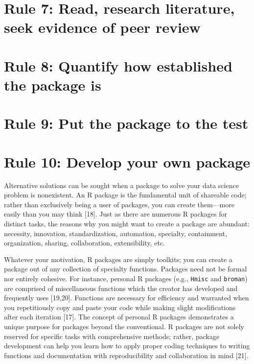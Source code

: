 \documentclass[10pt,letterpaper]{article}
\begin{document}
\hypertarget{rule-7-read-research-literature-seek-evidence-of-peer-review}{%
\section{Rule 7: Read, research literature, seek evidence of peer
review}\label{rule-7-read-research-literature-seek-evidence-of-peer-review}}

\hypertarget{rule-8-quantify-how-established-the-package-is}{%
\section{Rule 8: Quantify how established the package
is}\label{rule-8-quantify-how-established-the-package-is}}

\hypertarget{rule-9-put-the-package-to-the-test}{%
\section{Rule 9: Put the package to the
test}\label{rule-9-put-the-package-to-the-test}}

\hypertarget{rule-10-develop-your-own-package}{%
\section{Rule 10: Develop your own
package}\label{rule-10-develop-your-own-package}}

Alternative solutions can be sought when a package to solve your data
science problem is nonexistent. An R package is the fundamental unit of
shareable code; rather than exclusively being a user of packages, you
can create them---more easily than you may think {[}18{]}. Just as there
are numerous R packages for distinct tasks, the reasons why you might
want to create a package are abundant: necessity, innovation,
standardization, automation, specialty, containment, organization,
sharing, collaboration, extensibility, etc.

Whatever your motivation, R packages are simply toolkits; you can create
a package out of any collection of specialty functions. Packages need
not be formal nor entirely cohesive. For instance, personal R packages
(e.g., \texttt{Hmisc} and \texttt{broman}) are comprised of
miscellaneous functions which the creator has developed and frequently
uses {[}19,20{]}. Functions are necessary for efficiency and warranted
when you repetitiously copy and paste your code while making slight
modifications after each iteration {[}17{]}. The concept of personal R
packages demonstrates a unique purpose for packages beyond the
conventional. R packages are not solely reserved for specific tasks with
comprehensive methods; rather, package development can help you learn
how to apply proper coding techniques to writing functions and
documentation with reproducibility and collaboration in mind {[}21{]}.
\end{document}
